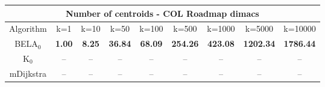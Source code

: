 \begin{tabular}{c|cccccccc}\toprule
\multicolumn{9}{c}{Number of centroids - COL Roadmap dimacs}\\ \midrule
Algorithm & k=1 & k=10 & k=50 & k=100 & k=500 & k=1000 & k=5000 & k=10000 \\ \midrule
BELA$_0$ & \textbf{1.00} & \textbf{8.25} & \textbf{36.84} & \textbf{68.09} & \textbf{254.26} & \textbf{423.08} & \textbf{1202.34} & \textbf{1786.44} \\
K$_0$ & -- & -- & -- & -- & -- & -- & -- & -- \\
mDijkstra & -- & -- & -- & -- & -- & -- & -- & -- \\ \bottomrule 
\end{tabular}
